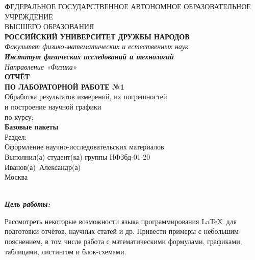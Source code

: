 ﻿






\begin{titlepage}
   {\centering
	   \MakeUppercase{%
		  {\footnotesize
			 Федеральное государственное автономное образовательное учреждение\\[-2.75ex]
			 высшего образования
		  }\\[0.2cm]
		  {\bfseries Российский университет дружбы народов}
	   }\\[0.75cm]
	   {\itshape\small
		  Факультет физико-математических и естественных наук\\[-1.5ex]
		  {\bfseries Институт физических исследований и технологий}\\[-1.5ex]
		  Направление «Физика»\\[1cm]
	   }
	   \MakeUppercase{%
		  \bfseries
		  {\large Отчёт}\\[0.75cm]
		  по лабораторной работе №1
	   }\\[1.5cm]
	   Обработка результатов измерений, их погрешностей\\[-1.5ex]
	   и построение научной графики\\[-0.2cm]
	   {\footnotesize по курсу:}\\[-0.2cm]
	   {\bfseries Базовые пакеты}\\[-0.2cm]
	   {\footnotesize Раздел:}\\[-0.2cm]
	   {\normalsize Оформление научно-исследовательских материалов}%
   }\\[1.5cm]
   {\raggedleft\normalsize
	  Выполнил(а) студент(ка) группы НФЗбд-01-20\\[0.5cm]
	  Иванов(а)~Александр(а)\\
   }
   \vfill
   {\centering\normalsize%
      Москва\\[-1.5ex]
	  \the\year{}\\
   }
\end{titlepage}


\tableofcontents

\newpage


{\bfseries\itshape Цель работы:}
\label{sec:work_goal}
Рассмотреть некоторые возможности языка программирования \LaTeX\ для подготовки отчётов, научных статей и др. Привести примеры с небольшим пояснением, в том числе работа с математическими формулами, графиками, таблицами, листингом и блок\nobreak-схемами.


